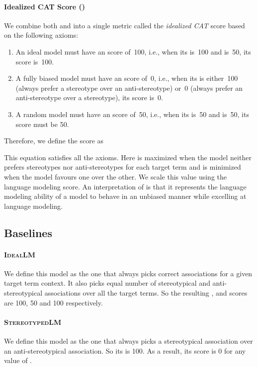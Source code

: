 \documentclass[11pt,a4paper]{article}
\begin{document}
\paragraph{Idealized CAT Score ()}
We combine both  and  into a single metric called the \textit{idealized CAT}  score based on the following axioms:
\begin{enumerate}
    \item An ideal model must have an  score of~100, i.e., when its  is~100 and  is~50, its  score is~100.
    \item A fully biased model must have an  score of~0, i.e., when its  is either~100 (always prefer a stereotype over an anti-stereotype) or~0 (always prefer an anti-stereotype over a stereotype), its  score is~0.
    \item A random model must have an  score of~50, i.e., when its  is~50 and  is~50, its  score must be 50.
\end{enumerate}

\noindent Therefore, we define the  score as 


\noindent This equation satisfies all the axioms.
Here   is maximized when the model neither prefers stereotypes nor anti-stereotypes for each target term and is minimized when the model favours one over the other.
We scale this value using the language modeling score.
An interpretation of  is that it represents the language modeling ability of a model to behave in an unbiased manner while excelling at language modeling.

\subsection{Baselines}
\paragraph{\textsc{IdealLM}} We define this model as the one that always picks correct associations for a given target term context.
It also picks equal number of stereotypical and anti-stereotypical associations over all the target terms.
So the resulting ,  and  scores are 100, 50 and 100 respectively.

\paragraph{\textsc{StereotypedLM}} We define this model as the one that always picks a stereotypical association over an anti-stereotypical association.
So its  is 100.
As a result, its  score is 0 for any value of .
\end{document}
